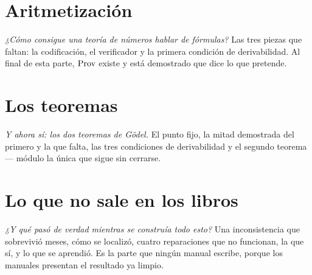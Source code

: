 \documentclass[11pt,openright]{book}
\begin{document}
\part{Aritmetización}
\label{parte:aritmetizacion}

\noindent \emph{¿Cómo consigue una teoría de números hablar de fórmulas?} Las tres piezas que faltan: la codificación, el verificador y la primera condición de derivabilidad. Al final de esta parte, $\operatorname{Prov}$ existe y está demostrado que dice lo que pretende.

\part{Los teoremas}
\label{parte:teoremas}

\noindent \emph{Y ahora sí: los dos teoremas de Gödel.} El punto fijo, la mitad demostrada del primero y la que falta, las tres condiciones de derivabilidad y el segundo teorema — módulo la única que sigue sin cerrarse.

\part{Lo que no sale en los libros}
\label{parte:noescrito}

\noindent \emph{¿Y qué pasó de verdad mientras se construía todo esto?} Una inconsistencia que sobrevivió meses, cómo se localizó, cuatro reparaciones que no funcionan, la que sí, y lo que se aprendió. Es la parte que ningún manual escribe, porque los manuales presentan el resultado ya limpio.
\end{document}
